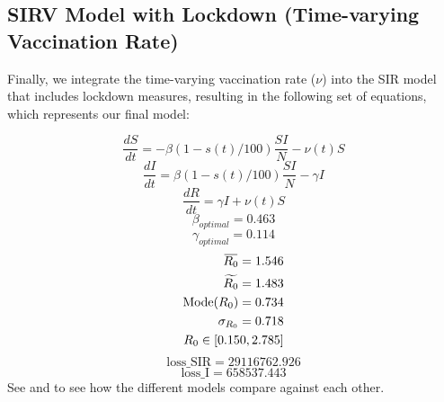 \documentclass[tikz,fleqn,12pt]{wlscirep}
\newcommand{\overbar}[1]{\mkern 1.5mu\overline{\mkern-1.5mu#1\mkern-1.5mu}\mkern 1.5mu}
\begin{document}
\subsection{SIRV Model with Lockdown (Time-varying Vaccination Rate)}
Finally, we integrate the time-varying vaccination rate ($\nu$) into the SIR model that includes lockdown measures, resulting in the following set of equations, which represents our final model:
\begin{figure}[htbp!]
\end{figure}
\begin{equation}
  \frac{dS}{dt} = -\beta  (1 - s(t)/100)  \frac{S I}{N} - \nu(t) S
  \label{eq:S_with_lockdown_and_time_varying_nu}
\end{equation}
\begin{equation}
  \frac{dI}{dt} = \beta  (1 - s(t)/100) \frac{S I}{N} - \gamma I
  \label{eq:I_with_lockdown_and_time_varying_nu}
\end{equation}
\begin{equation}
  \frac{dR}{dt} = \gamma I + \nu(t) S
  \label{eq:R_with_lockdown_and_time_varying_nu}
\end{equation}
\begin{equation}
  \beta_{optimal} = 0.463
  \label{eq:beta_optimal_with_lockdown_and_time_varying_nu}
\end{equation}
\begin{equation}
  \gamma_{optimal} = 0.114
  \label{eq:gamma_optimal_with_lockdown_and_time_varying_nu}
\end{equation}
\begin{equation}
  \begin{split}
    \overbar{R_0} = 1.546 \\
    \widetilde{R_0} = 1.483 \\
    \text{Mode}(R_0) = 0.734 \\
    \sigma_{R_0} = 0.718 \\
    R_0 \in [0.150, 2.785]
  \end{split}
  \label{eq:r0_with_lockdown_and_time_varying_nu}
\end{equation}
\begin{equation}
  \textrm{loss\_SIR} = 29116762.926
  \label{eq:cost_SIR_with_lockdown_and_time_varying_nu}
\end{equation}
\begin{equation}
  \textrm{loss\_I} = 658537.443
  \label{eq:cost_I_with_lockdown_and_time_varying_nu}
\end{equation}
See  and  to see how the different models compare against each other.
\end{document}
